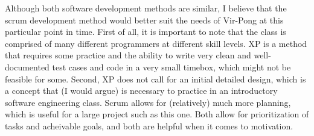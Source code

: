 \documentclass[12pt, letterpaper]{article}
\begin{document}
Although both software development methods are similar, I believe that the scrum development method would better suit the needs of Vir-Pong at this particular point in time. First of all, it is important to note that the class is comprised of many different programmers at different skill levels. XP is a method that requires some practice and the ability to write very clean and well-documented test cases and code in a very small timebox, which might not be feasible for some. Second, XP does not call for an initial detailed design, which is a concept that (I would argue) is necessary to practice in an introductory software engineering class. Scrum allows for (relatively) much more planning, which is useful for a large project such as this one. Both allow for prioritization of tasks and acheivable goals, and both are helpful when it comes to motivation. 



\end{document}
